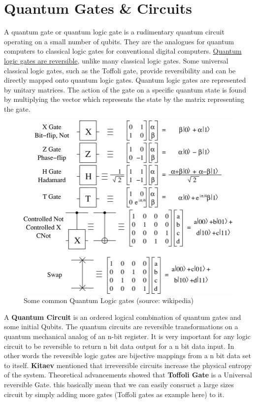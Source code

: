 \section{Quantum Gates \& Circuits}
A quantum gate or quantum logic gate is a rudimentary quantum circuit operating on a small number of qubits. They are the analogues for quantum computers to classical logic gates for conventional digital computers. \underline{Quantum logic gates are reversible}, unlike many classical logic gates. Some universal classical logic gates, such as the Toffoli gate, provide reversibility and can be directly mapped onto quantum logic gates. Quantum logic gates are represented by unitary matrices. The action of the gate on a specific quantum state is found by multiplying the vector which represents the state by the matrix representing the gate.\\


\begin{figure}[!htb]
\centering
  \includegraphics[scale=0.4]{qgates}
  \caption{Some common Quantum Logic gates (source: wikipedia)}
\end{figure}

A \textbf{Quantum Circuit} is an ordered logical combination of quantum gates and some initial Qubits. The quantum circuits are reversible transformations on a quantum mechanical analog of an n-bit register. It is very important for any logic circuit to be reversible to return n bit data output for a n bit data input. In other words the reversible logic gates are bijective mappings from a n bit data set to itself. \textbf{Kitaev} mentioned that irreversible circuits increase the physical entropy of the system. Theoretical advancements showed that \textbf{Toffoli Gate} is a Universal reversible Gate. this basically mean that we can easily consruct a large sizes circuit by simply adding more gates (Toffoli gates as example here) to it.

